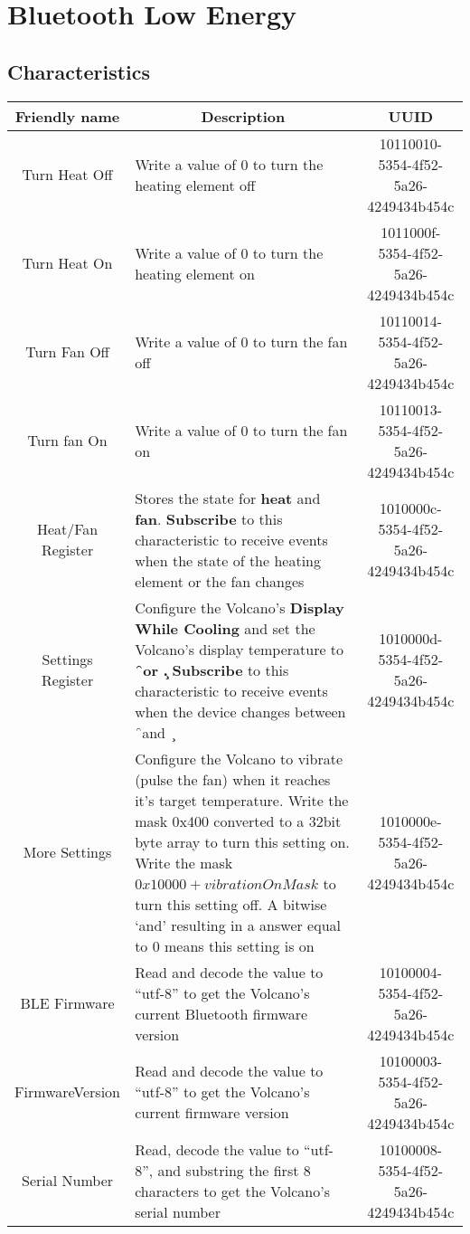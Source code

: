 \chapter{Bluetooth Low Energy}
\section{Characteristics}
\begin{longtable}{c|p{2.1in}|c}
\textbf{Friendly name} & \multicolumn{1}{|c|}{\textbf{Description}} & \textbf{UUID} \\ \hline
Turn Heat Off & Write a value of 0 to turn the heating element off & 10110010-5354-4f52-5a26-4249434b454c \\ \hline
Turn Heat On & Write a value of 0 to turn the heating element on & 1011000f-5354-4f52-5a26-4249434b454c \\ \hline
Turn Fan Off & Write a value of 0 to turn the fan off & 10110014-5354-4f52-5a26-4249434b454c\\ \hline
Turn fan On & Write a value of 0 to turn the fan on & 10110013-5354-4f52-5a26-4249434b454c\\ \hline
Heat/Fan Register & Stores the state for \textbf{heat} and \textbf{fan}.  \textbf{Subscribe} to this characteristic to receive events when the state of the heating element or the fan changes & 1010000c-5354-4f52-5a26-4249434b454c \\ \hline 
Settings Register & Configure the Volcano's \textbf{Display While Cooling} and set the Volcano's display temperature to \textbf{\f\ or \c.} \textbf{Subscribe} to this characteristic to receive events when the device changes between \f\ and \c\ & 1010000d-5354-4f52-5a26-4249434b454c \\ \hline
More Settings & Configure the Volcano to vibrate (pulse the fan) when it reaches it's target temperature. Write the mask 0x400 converted to a 32bit byte array to turn this setting on. Write the mask $0x10000 + vibrationOnMask$ to turn this setting off. A bitwise `and' resulting in a answer equal to 0 means this setting is on   &  1010000e-5354-4f52-5a26-4249434b454c \\ \hline
BLE Firmware&Read and decode the value to ``utf-8'' to get the Volcano's current Bluetooth firmware version&10100004-5354-4f52-5a26-4249434b454c\\ \hline
FirmwareVersion&Read and decode the value to ``utf-8'' to get the Volcano's current firmware version&10100003-5354-4f52-5a26-4249434b454c\\ \hline
Serial Number&Read, decode the value to ``utf-8'', and substring the first 8 characters to get the Volcano's serial number &10100008-5354-4f52-5a26-4249434b454c\\ \hline

\end{longtable}
